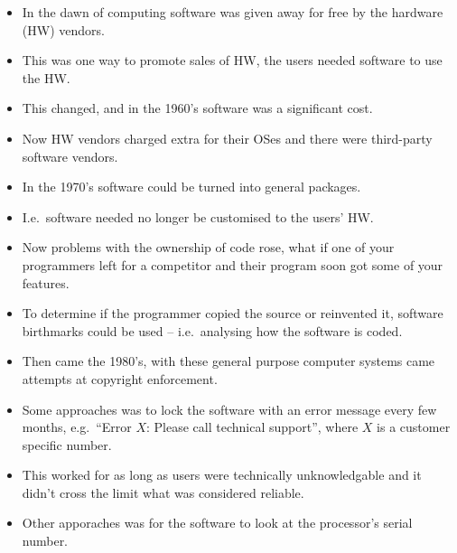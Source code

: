 \documentclass{beamer}
\begin{document}
\begin{frame}{\insertsubsectionhead}
  \begin{itemize}
    \item In the dawn of computing software was given away for free by the 
      hardware (HW) vendors.

    \item This was one way to promote sales of HW, the users needed software to 
      use the HW\@.

    \item This changed, and in the 1960's software was a significant cost.

    \item Now HW vendors charged extra for their OSes and there were 
      third-party software vendors.
  \end{itemize}
\end{frame}

\begin{frame}{\insertsubsectionhead}
  \begin{itemize}
    \item In the 1970's software could be turned into general packages.

    \item I.e.\ software needed no longer be customised to the users' HW\@.

    \item Now problems with the ownership of code rose, what if one of your 
      programmers left for a competitor and their program soon got some of your 
      features.

    \item To determine if the programmer copied the source or reinvented it, 
      software birthmarks could be used -- i.e.\ analysing how the software is 
      coded.
  \end{itemize}
\end{frame}

\begin{frame}{\insertsubsectionhead}
  \begin{itemize}
    \item Then came the 1980's, with these general purpose computer systems 
      came attempts at copyright enforcement.

    \item Some approaches was to lock the software with an error message every 
      few months, e.g.\ ``Error \(X\):  Please call technical support'', where 
      \(X\) is a customer specific number.

    \item This worked for as long as users were technically unknowledgable and 
      it didn't cross the limit what was considered reliable.

    \item Other apporaches was for the software to look at the processor's 
      serial number.
  \end{itemize}
\end{frame}
\end{document}
